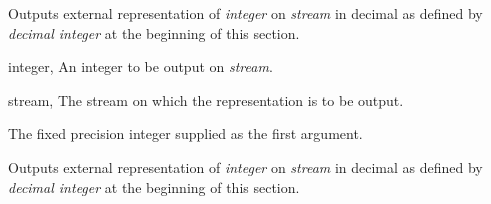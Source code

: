 \begin{optDefinition}
\remarks%
Outputs external representation of {\em integer\/} on {\em stream\/}
in decimal as defined by {\em decimal integer} at the beginning of
this section.

\begin{specargs}
\item[integer, \classref{fixed-precision-integer}] An integer to be output on {\em stream}.
\item[stream, \classref{stream}] The stream on which the representation is
to be output.
\end{specargs}

\result%
The fixed precision integer supplied as the first argument.

\remarks%
Outputs external representation of {\em integer\/} on {\em stream\/}
in decimal as defined by {\em decimal integer} at the beginning of
this section.

\end{optDefinition}
